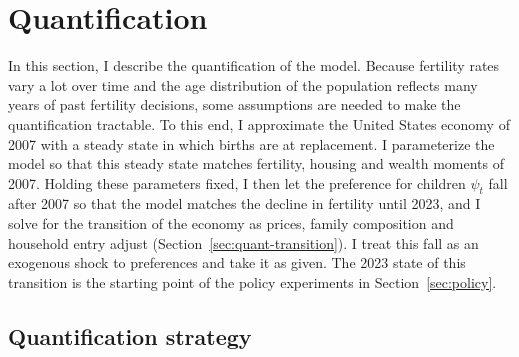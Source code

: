 
\section{Quantification}
\label{sec:quant}
\label{sec:quantification}

In this section, I describe the quantification of the model. Because
fertility rates vary a lot over time and the age distribution of the
population reflects many years of past fertility decisions, some assumptions
are needed to make the quantification tractable. To this end, I approximate
the United States economy of 2007 with a steady state in which births are at
replacement. I parameterize the model so that this steady state matches
fertility, housing and wealth moments of 2007. Holding these parameters
fixed, I then let the preference for children $\psi_t$ fall after 2007 so
that the model matches the decline in fertility until 2023, and I solve for
the transition of the economy as prices, family composition and household
entry adjust (Section~\ref{sec:quant-transition}). I treat this fall as an
exogenous shock to preferences and take it as given. The 2023 state of this
transition is the starting point of the policy experiments in
Section~\ref{sec:policy}.

\subsection{Quantification strategy}
\label{sec:quant-approach}

